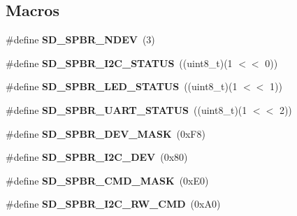 \subsection*{Macros}
\begin{DoxyCompactItemize}
\item 
\mbox{\label{group___s_d___s_p_i___bridge_ga98bb51ae4436b20910e2da1093e1fb4e}} 
\#define {\bfseries S\+D\+\_\+\+S\+P\+B\+R\+\_\+\+N\+D\+EV}~(3)
\item 
\mbox{\label{group___s_d___s_p_i___bridge_gad016b41dcc88c418480b2350a657c2d8}} 
\#define {\bfseries S\+D\+\_\+\+S\+P\+B\+R\+\_\+\+I2\+C\+\_\+\+S\+T\+A\+T\+US}~((uint8\+\_\+t)(1 $<$$<$ 0))
\item 
\mbox{\label{group___s_d___s_p_i___bridge_ga85c8cbe45773ed01124193386845d823}} 
\#define {\bfseries S\+D\+\_\+\+S\+P\+B\+R\+\_\+\+L\+E\+D\+\_\+\+S\+T\+A\+T\+US}~((uint8\+\_\+t)(1 $<$$<$ 1))
\item 
\mbox{\label{group___s_d___s_p_i___bridge_gad7d58d6fc704c74b58fd6462431a350d}} 
\#define {\bfseries S\+D\+\_\+\+S\+P\+B\+R\+\_\+\+U\+A\+R\+T\+\_\+\+S\+T\+A\+T\+US}~((uint8\+\_\+t)(1 $<$$<$ 2))
\item 
\mbox{\label{group___s_d___s_p_i___bridge_ga59e1279217436eeb3199a07afceebe20}} 
\#define {\bfseries S\+D\+\_\+\+S\+P\+B\+R\+\_\+\+D\+E\+V\+\_\+\+M\+A\+SK}~(0x\+F8)
\item 
\mbox{\label{group___s_d___s_p_i___bridge_ga555ad1faec4521d7b0bb394bb9cab9bd}} 
\#define {\bfseries S\+D\+\_\+\+S\+P\+B\+R\+\_\+\+I2\+C\+\_\+\+D\+EV}~(0x80)
\item 
\mbox{\label{group___s_d___s_p_i___bridge_ga1f3e4e48ed33b5e21914820a6090ec54}} 
\#define {\bfseries S\+D\+\_\+\+S\+P\+B\+R\+\_\+\+C\+M\+D\+\_\+\+M\+A\+SK}~(0x\+E0)
\item 
\mbox{\label{group___s_d___s_p_i___bridge_gabebfa50f216c2717e870b62b00dbad4e}} 
\#define {\bfseries S\+D\+\_\+\+S\+P\+B\+R\+\_\+\+I2\+C\+\_\+\+R\+W\+\_\+\+C\+MD}~(0x\+A0)
$$
\end{DoxyCompactItemize}
